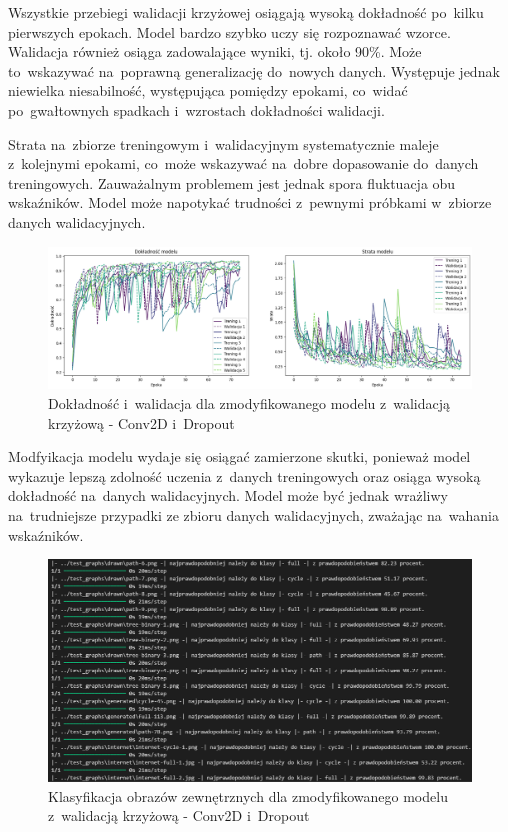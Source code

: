 Wszystkie przebiegi walidacji krzyżowej osiągają wysoką dokładność po~kilku pierwszych epokach.
Model bardzo szybko uczy się rozpoznawać wzorce.
Walidacja również osiąga zadowalające wyniki, tj. około 90\%. Może to~wskazywać na~poprawną generalizację do~nowych danych.
Występuje jednak niewielka niesabilność, występująca pomiędzy epokami,
co~widać po~gwałtownych spadkach i~wzrostach dokładności walidacji.

Strata na~zbiorze treningowym i~walidacyjnym systematycznie maleje z~kolejnymi epokami,
co~może wskazywać na~dobre dopasowanie do~danych treningowych.
Zauważalnym problemem jest jednak spora fluktuacja obu wskaźników.
Model może napotykać trudności z~pewnymi próbkami w~zbiorze danych walidacyjnych. 

\begin{figure}[ht]
	\centering
	\includegraphics[width=15.5cm]{resources/tests/images/v4/crossvalid_1_img.png}
	\caption{Dokładność i~walidacja dla zmodyfikowanego modelu z~walidacją krzyżową - Conv2D i~Dropout}
	\label{Fig:tests-cv-1a}
\end{figure}
\FloatBarrier

Modfyikacja modelu wydaje się osiągać zamierzone skutki,
ponieważ model wykazuje lepszą zdolność uczenia z~danych treningowych
oraz osiąga wysoką dokładność na~danych walidacyjnych.
Model może być jednak wrażliwy na~trudniejsze przypadki ze zbioru danych walidacyjnych,
zważając na~wahania wskaźników.

\begin{figure}[ht]
	\centering
	\includegraphics[width=15.5cm]{resources/tests/images/v4/crossvalid_1_txt.png}
	\caption{Klasyfikacja obrazów zewnętrznych dla zmodyfikowanego modelu z~walidacją krzyżową - Conv2D i~Dropout}
	\label{Fig:tests-cv-1b}
\end{figure}
\FloatBarrier

